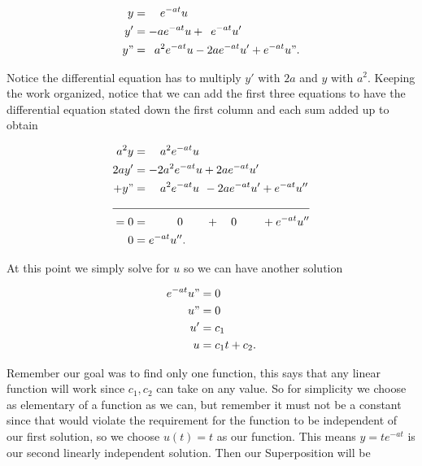 \documentclass[12pt]{article}
\begin{document}
\begin{align*}
    y &= \hspace{10 pt} e^{-at}u \\
    y' &= -ae^{-at}u+ \hspace{5 pt} e^{-at}u' \\
    y" &= \hspace{5 pt} a^2e^{-at}u-2ae^{-at}u'+e^{-at}u".
\end{align*}

Notice the differential equation has to multiply $y'$ with $2a$ and $y$ with $a^2$. Keeping the work organized, notice that we can add the first three equations to have the differential equation stated down the first column and each sum added up to obtain

\begin{align*}
    a^2 y &= \hspace{10 pt}a^2e^{-at}u \\
    2a y' &= -2a^2 e^{-at}u+ 2ae^{-at}u' \\
    +y" &= \hspace{10 pt} a^2e^{-at}u \hspace{4 pt}-2ae^{-at}u'+e^{-at}u'' \\
    \cline{1-2}
    =0 &= \hspace{25 pt} 0 \hspace{20 pt} + \hspace{10 pt}  0 \hspace{22 pt} + e^{-at}u'' \\
    0 &= e^{-at}u''.
\end{align*}

At this point we simply solve for $u$ so we can have another solution

\begin{align*}
    e^{-at}u" &= 0 \\
    u" &= 0 \\
    u' &= c_1 \\
    u &= c_1t+c_2.
\end{align*}

Remember our goal was to find only one function, this says that any linear function will work since $c_1, c_2$ can take on any value. So for simplicity we choose as elementary of a function as we can, but remember it must not be a constant since that would violate the requirement for the function to be independent of our first solution, so we choose $u(t)=t$ as our function. This means $y=te^{-at}$ is our second linearly independent solution. Then our Superposition will be
\end{document}
